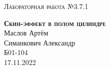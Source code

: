 \documentclass[12pt,a4paper]{extreport}
\begin{document}
		
		\begin{center}
			\large
			\textsc{Лабораторная работа №3.7.1}
			
			\LARGE
			\textbf{\textsc{Скин-эффект в полом цилиндре}}
			\\[5mm]
			
			\large
			Маслов Артём\\
			Симанкович Александр\\
			Б01-104
			\\[3mm]
			17.11.2022
		\end{center}
		
		
		
		
		
		\newpage
		
		
		
		
		
		
		
		\newpage
		
		
		
	
\end{document}
